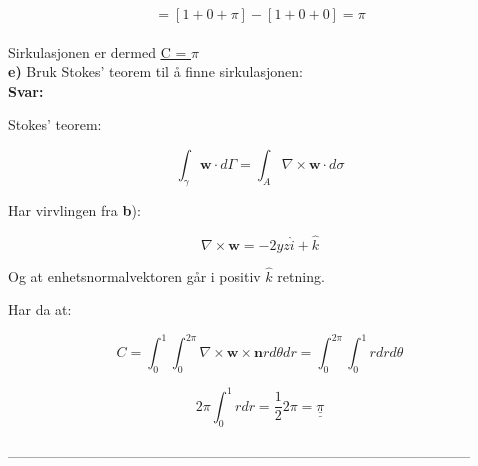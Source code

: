 \documentclass[a4paper,norsk,12pt]{article}
\begin{document}
$$ = [1+0 + \pi] - [1 + 0 + 0] = \pi $$\\


\def\doubleunderline#1{\underline{\underline{#1}}} 
Sirkulasjonen er dermed \doubleunderline{C = $\pi$}
\\

\textbf{e)} Bruk Stokes' teorem til å finne sirkulasjonen:\\

\textbf{Svar:}

Stokes' teorem:

$$
\int_\gamma \textbf{w} \cdot d \Gamma = \int_A \nabla \times \textbf{w} \cdot d \sigma
$$


Har virvlingen fra \textbf{b}):

$$\nabla \times \textbf{w} = {-2yz \hat i + \hat k}$$

Og at enhetsnormalvektoren går i positiv $\hat k $ retning.

Har da at:

$$
C = \int_0^1 \int_0^{2 \pi} \nabla \times \textbf{w} \times \textbf{n} r d \theta dr = \int_0^{2 \pi} \int_0^1 r dr d \theta
$$

$$
2 \pi \int_0^1 r dr = \dfrac{1}{2} 2 \pi = \doubleunderline{\pi}
$$

____________________________________________
\end{document}

